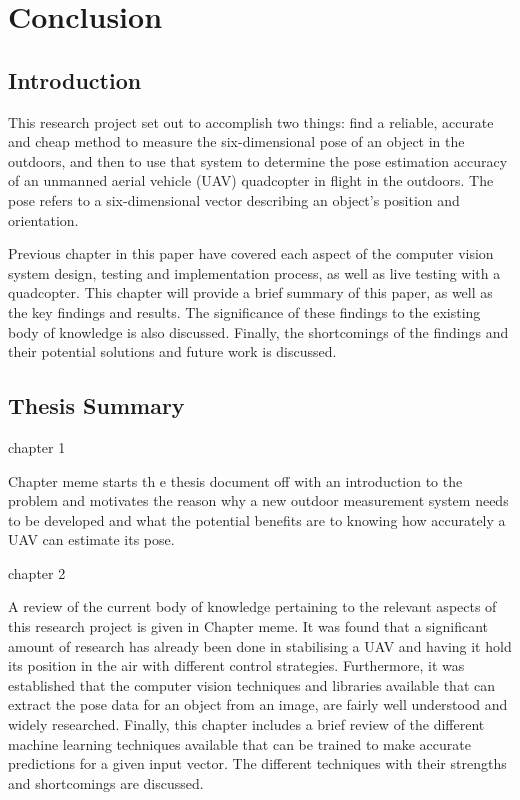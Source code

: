 \chapter{Conclusion}

\section{Introduction}

This research project set out to accomplish two things: find a reliable, accurate and cheap method to measure the six-dimensional pose of an object in the outdoors, and then to use that system to determine the pose estimation accuracy of an unmanned aerial vehicle (UAV) quadcopter in flight in the outdoors. The pose refers to a six-dimensional vector describing an object's position and orientation. 

Previous chapter in this paper have covered each aspect of the computer vision system design, testing and implementation process, as well as live testing with a quadcopter. This chapter will provide a brief summary of this paper, as well as the key findings and results. The significance of these findings to the existing body of knowledge is also discussed. Finally, the shortcomings of the findings and their potential solutions and future work is discussed. 

\section{Thesis Summary}

chapter 1 

Chapter meme starts th e thesis document off with an introduction to the problem and motivates the reason why a new outdoor measurement system needs to be developed and what the potential benefits are to knowing how accurately a UAV can estimate its pose.  

chapter 2

A review of the current body of knowledge pertaining to the relevant aspects of this research project is given in Chapter meme. It was found that a significant amount of research has already been done in stabilising a UAV and having it hold its position in the air with different control strategies. Furthermore, it was established that the computer vision techniques and libraries available that can extract the pose data for an object from an image, are fairly well understood and widely researched. Finally, this chapter includes a brief review of the different machine learning techniques available that can be trained to make accurate predictions for a given input vector. The different techniques with their strengths and shortcomings are discussed.  


